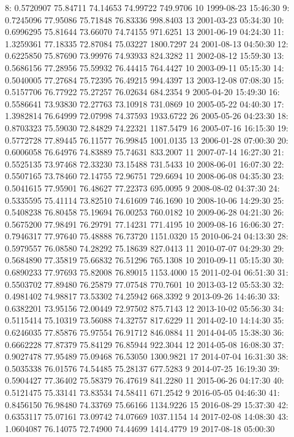 \documentclass[
  10pt,
  a4paper,oneside]{article}
\begin{document}
8: 0.5720907 75.84711 74.14653 74.99722 749.9706 10 1999-08-23 15:46:30
9: 0.7245096 77.95086 75.71848 76.83336 998.8403 13 2001-03-23 05:34:30
10: 0.6996295 75.81644 73.66070 74.74155 971.6251 13 2001-06-19 04:24:30
11: 1.3259361 77.18335 72.87084 75.03227 1800.7297 24 2001-08-13 04:50:30
12: 0.6225850 75.87690 73.99976 74.93933 824.3282 11 2002-08-12 15:59:30
13: 0.5686156 77.28956 75.59932 76.44415 764.4427 10 2003-09-11 05:15:30
14: 0.5040005 77.27684 75.72395 76.49215 994.4397 13 2003-12-08 07:08:30
15: 0.5157706 76.77922 75.27257 76.02634 684.2354 9 2005-04-20 15:49:30
16: 0.5586641 73.93830 72.27763 73.10918 731.0869 10 2005-05-22 04:40:30
17: 1.3982814 76.64999 72.07998 74.37593 1933.6722 26 2005-05-26 04:23:30
18: 0.8703323 75.59030 72.84829 74.22321 1187.5479 16 2005-07-16 16:15:30
19: 0.5772728 77.89445 76.11577 76.99845 1001.0135 13 2006-01-28 07:00:30
20: 0.6006058 76.64976 74.83889 75.74631 833.2007 11 2007-07-14 16:27:30
21: 0.5525135 73.97468 72.33230 73.15488 731.5433 10 2008-06-01 16:07:30
22: 0.5507165 73.78460 72.14755 72.96751 729.6694 10 2008-06-08 04:35:30
23: 0.5041615 77.95901 76.48627 77.22373 695.0095 9 2008-08-02 04:37:30
24: 0.5335595 75.41114 73.82510 74.61609 746.1690 10 2008-10-06 14:29:30
25: 0.5408238 76.80458 75.19694 76.00253 760.0182 10 2009-06-28 04:21:30
26: 0.5675200 77.98491 76.29791 77.14231 771.4195 10 2009-08-16 16:06:30
27: 0.7946317 77.97640 75.48888 76.73720 1151.0320 15 2010-06-24 04:13:30
28: 0.5979557 76.08580 74.28292 75.18639 827.0413 11 2010-07-07 04:29:30
29: 0.5684890 77.35819 75.66832 76.51296 765.1308 10 2010-09-11 05:15:30
30: 0.6890233 77.97693 75.82008 76.89015 1153.4000 15 2011-02-04 06:51:30
31: 0.5503702 77.89480 76.25879 77.07548 770.7601 10 2013-03-12 05:53:30
32: 0.4981402 74.98817 73.53302 74.25942 668.3392 9 2013-09-26 14:46:30
33: 0.6382201 73.95156 72.00449 72.97502 875.7143 12 2013-10-02 05:56:30
34: 0.5115414 75.10319 73.56088 74.32757 817.6229 11 2014-02-10 14:14:30
35: 0.6246035 77.85876 75.97554 76.91712 846.0884 11 2014-04-05 15:38:30
36: 0.6662228 77.87379 75.84129 76.85944 922.3044 12 2014-05-08 16:08:30
37: 0.9027478 77.95489 75.09468 76.53050 1300.9821 17 2014-07-04 16:31:30
38: 0.5035338 76.01576 74.54485 75.28137 677.5283 9 2014-07-25 16:19:30
39: 0.5904427 77.36402 75.58379 76.47619 841.2280 11 2015-06-26 04:17:30
40: 0.5121475 75.33141 73.83534 74.58411 671.2542 9 2016-05-05 04:46:30
41: 0.8456150 76.98480 74.33769 75.66166 1134.9226 15 2016-08-29 15:37:30
42: 0.6353117 75.07161 73.09742 74.07669 1037.1154 14 2017-02-08 14:08:30
43: 1.0604087 76.14075 72.74900 74.44699 1414.4779 19 2017-08-18 05:00:30
\end{document}
